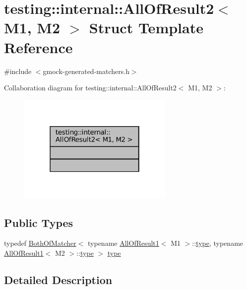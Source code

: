 \hypertarget{structtesting_1_1internal_1_1AllOfResult2}{}\section{testing\+:\+:internal\+:\+:All\+Of\+Result2$<$ M1, M2 $>$ Struct Template Reference}
\label{structtesting_1_1internal_1_1AllOfResult2}


{\ttfamily \#include $<$gmock-\/generated-\/matchers.\+h$>$}



Collaboration diagram for testing\+:\+:internal\+:\+:All\+Of\+Result2$<$ M1, M2 $>$\+:
\nopagebreak
\begin{figure}[H]
\begin{center}
\leavevmode
\includegraphics[width=214pt]{structtesting_1_1internal_1_1AllOfResult2__coll__graph}
\end{center}
\end{figure}
\subsection*{Public Types}
\begin{DoxyCompactItemize}
\item 
typedef \hyperlink{classtesting_1_1internal_1_1BothOfMatcher}{Both\+Of\+Matcher}$<$ typename \hyperlink{structtesting_1_1internal_1_1AllOfResult1}{All\+Of\+Result1}$<$ M1 $>$\+::\hyperlink{structtesting_1_1internal_1_1AllOfResult2_adec0b0ce2fdd07d398e1fdd2cdb88392}{type}, typename \hyperlink{structtesting_1_1internal_1_1AllOfResult1}{All\+Of\+Result1}$<$ M2 $>$\+::\hyperlink{structtesting_1_1internal_1_1AllOfResult2_adec0b0ce2fdd07d398e1fdd2cdb88392}{type} $>$ \hyperlink{structtesting_1_1internal_1_1AllOfResult2_adec0b0ce2fdd07d398e1fdd2cdb88392}{type}
\end{DoxyCompactItemize}


\subsection{Detailed Description}
